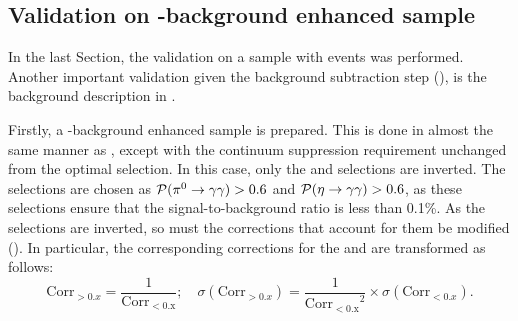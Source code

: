 \subsection{Validation on \texorpdfstring{\BB}{BB}-background enhanced sample}\label{sec:bb_background_validation}

In the last Section, the validation on a sample with \epem\ra\qqbar events was performed.
Another important validation given the background subtraction step (),
is the \BB background description in \MC.

Firstly, a \BB-background enhanced sample is prepared.
This is done in almost the same manner as , except with the continuum suppression requirement unchanged from the optimal selection.
In this case, only the \piVeto and \etaVeto selections are inverted.
The selections are chosen as ${\mathcal{P}(\pi^0\rightarrow\gamma\gamma)}>0.6$ and ${\mathcal{P}(\eta\rightarrow\gamma\gamma)}>0.6$, as these selections ensure that the signal-to-background ratio is less than 0.1\%.
As the selections are inverted, so must the corrections that account for them be modified ().
In particular, the corresponding corrections for the \piVeto and \etaVeto are transformed as follows:
\begin{equation}\label{eq:correction_transform}
    \mathrm{Corr}_{>0.x} = \frac{1}{\mathrm{Corr_{<0.x}}}; \quad \sigma(\mathrm{Corr}_{>0.x}) =  \frac{1}{\mathrm{Corr_{<0.x}}^2} \times \sigma(\mathrm{Corr}_{<0.x}).
\end{equation}

